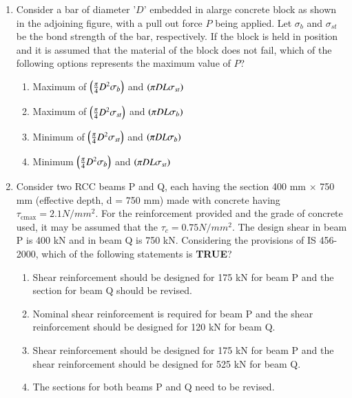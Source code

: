 \documentclass[journal,12pt,onecolumn]{IEEEtran}
\theoremstyle{remark}
\begin{document}
\begin{enumerate}
\newpage
\item Consider a bar of diameter '$D$' embedded in alarge concrete block as shown in the adjoining figure, with a pull out force $P$ being applied. Let $\sigma_b$ and $\sigma_{st}$ be the bond strength of the bar, respectively. If the block is held in position and it is assumed that the material of the block does not fail, which of the following options represents the maximum value of $P$?
\begin{figure}[ht]
\centering

\end{figure}
	\begin{multicols}{2}
	\begin{enumerate}
		\item Maximum of $\left(\frac{\pi}{4}D^{2}\sigma_{b}\right)$ and $\left(\pi DL\sigma_{st}\right)$
		\item Maximum of $\left(\frac{\pi}{4}D^{2}\sigma_{st}\right)$ and $\left(\pi DL\sigma_{b}\right)$
		\item Minimum of $\left(\frac{\pi}{4}D^{2}\sigma_{st}\right)$ and $\left(\pi DL\sigma_{b}\right)$
		\item Minimum $\left(\frac{\pi}{4}D^{2}\sigma_{b}\right)$ and $\left(\pi DL\sigma_{st}\right)$
	\end{enumerate}
	\end{multicols}

\item Consider two RCC beams P and Q, each having the section 400 mm $\times$ 750 mm (effective depth, d = 750 mm) made with concrete having $\tau_{\text{cmax}} = 2.1 N/mm^{2}$. For the reinforcement provided and the grade of concrete used, it may be assumed that the $\tau_c = 0.75 N/mm^{2}$. The design shear in beam P is 400 kN and in beam Q is 750 kN. Considering the provisions of IS 456-2000, which of the following statements is \textbf{TRUE}?
	\begin{enumerate}
		\item Shear reinforcement should be designed for 175 kN for beam P and the section for beam Q should be revised.
		\item Nominal shear reinforcement is required for beam P and the shear reinforcement should be designed for 120 kN for beam Q.
		\item Shear reinforcement should be designed for 175 kN for beam P and the shear reinforcement should be designed for 525 kN for beam Q.
		\item The sections for both beams P and Q need to be revised.
	\end{enumerate}




\end{enumerate}
\end{document}

